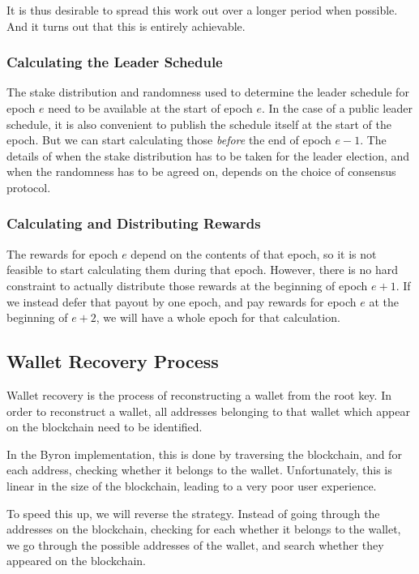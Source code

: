 \documentclass[11pt,a4paper]{article}
\begin{document}
It is thus desirable to spread this work out over a longer period when possible.
And it turns out that this is entirely achievable.

\subsubsection{Calculating the Leader Schedule}

The stake distribution and randomness used to determine the leader schedule for
epoch \(e\) need to be available at the start of epoch \(e\). In the case of a
public leader schedule, it is also convenient to publish the schedule itself at
the start of the epoch. But we can start calculating those \emph{before} the end
of epoch \(e-1\). The details of when the stake distribution has to be taken for
the leader election, and when the randomness has to be agreed on, depends on the
choice of consensus protocol.

\subsubsection{Calculating and Distributing Rewards}

The rewards for epoch \(e\) depend on the contents of that epoch, so it is not
feasible to start calculating them during that epoch. However, there is no hard
constraint to actually distribute those rewards at the beginning of epoch
\(e+1\). If we instead defer that payout by one epoch, and pay rewards for epoch
\(e\) at the beginning of \(e+2\), we will have a whole epoch for that
calculation.

\subsection{Wallet Recovery Process}
\label{wallet-recovery-process}

Wallet recovery is the process of reconstructing a wallet from the root
key. In order to reconstruct a wallet, all addresses belonging to that
wallet which appear on the blockchain need to be identified.

In the Byron implementation, this is done by traversing the
blockchain, and for each address, checking whether it belongs to the
wallet. Unfortunately, this is linear in the size of the blockchain,
leading to a very poor user experience.

To speed this up, we will reverse the strategy. Instead of going through
the addresses on the blockchain, checking for each whether it belongs to
the wallet, we go through the possible addresses of the wallet, and
search whether they appeared on the blockchain.
\end{document}
